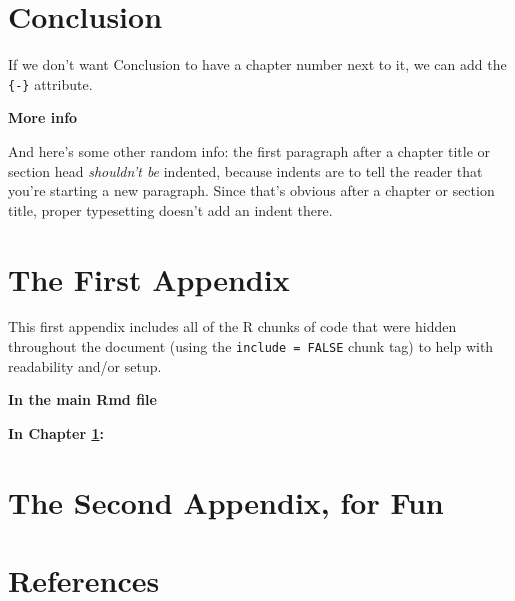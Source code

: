 \documentclass[12pt,twoside]{fmupthesis}
\begin{document}
\hypertarget{conclusion}{%
\chapter*{Conclusion}\label{conclusion}}

If we don't want Conclusion to have a chapter number next to it, we can add the \texttt{\{-\}} attribute.

\textbf{More info}

And here's some other random info: the first paragraph after a chapter title or section head \emph{shouldn't be} indented, because indents are to tell the reader that you're starting a new paragraph. Since that's obvious after a chapter or section title, proper typesetting doesn't add an indent there.

\appendix

\hypertarget{the-first-appendix}{%
\chapter{The First Appendix}\label{the-first-appendix}}

This first appendix includes all of the R chunks of code that were hidden throughout the document (using the \texttt{include\ =\ FALSE} chunk tag) to help with readability and/or setup.

\textbf{In the main Rmd file}

\textbf{In Chapter \ref{the-first-appendix}:}

\hypertarget{the-second-appendix-for-fun}{%
\chapter{The Second Appendix, for Fun}\label{the-second-appendix-for-fun}}

\backmatter

\hypertarget{references}{%
\chapter*{References}\label{references}}


\noindent

\setlength{\parindent}{-0.20in}
\setlength{\leftskip}{0.20in}
\setlength{\parskip}{8pt}
\end{document}
